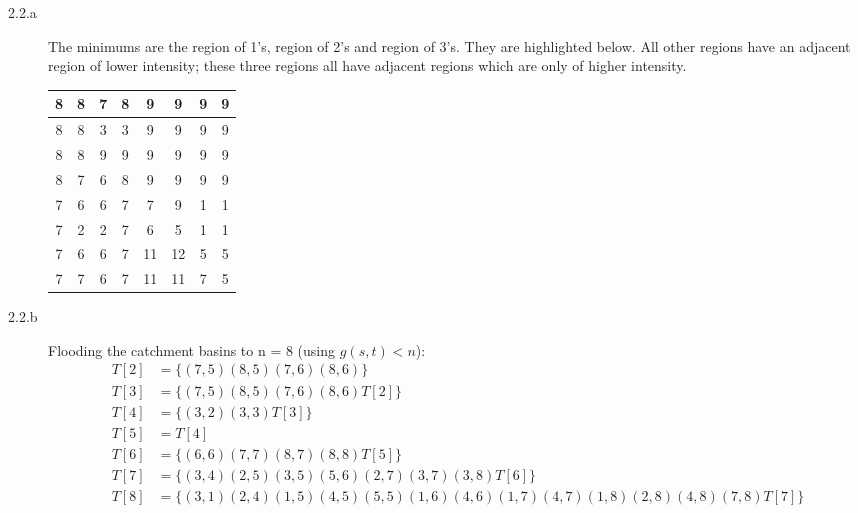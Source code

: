 \documentclass[fleqn]{article}
\begin{document}
\begin{description}
\item [2.2.a]
    The minimums are the region of 1's, region of 2's and region of 3's. They
        are highlighted below. All other regions have an adjacent region of
        lower intensity; these three regions all have adjacent regions which are
        only of higher intensity.

    \begin{tabular}{| c | c | c | c | c | c | c | c |}
        \hline
        8 & 8 & 7 & 8 & 9 & 9 & 9 & 9 \\ \hline
        8 & 8 & \cellcolor{green} 3 & \cellcolor{green} 3 & 9 & 9 & 9 & 9 \\ \hline
        8 & 8 & 9 & 9 & 9 & 9 & 9 & 9 \\ \hline
        8 & 7 & 6 & 8 & 9 & 9 & 9 & 9 \\ \hline
        7 & 6 & 6 & 7 & 7 & 9 & \cellcolor{green} 1 & \cellcolor{green} 1 \\ \hline
        7 & \cellcolor{green} 2 & \cellcolor{green} 2 & 7 & 6 & 5 & \cellcolor{green} 1 & \cellcolor{green} 1 \\ \hline
        7 & 6 & 6 & 7 & 11 & 12 & 5 & 5 \\ \hline
        7 & 7 & 6 & 7 & 11 & 11 & 7 & 5 \\
        \hline
    \end{tabular}

\item [2.2.b]
    Flooding the catchment basins to n = 8 (using \begin{math}g(s,t) <
    n\end{math}):
    \begin{align*}
        T[2] &= \{ (7,5) (8,5) (7,6) (8,6) \} \\
        T[3] &= \{ (7,5) (8,5) (7,6) (8,6) T[2] \} \\
        T[4] &= \{ (3,2) (3,3) T[3] \} \\
        T[5] &= T[4] \\
        T[6] &= \{ (6,6) (7,7) (8,7) (8,8) T[5] \} \\
        T[7] &= \{ (3,4) (2,5) (3,5) (5,6) (2,7) (3,7) (3,8) T[6] \} \\
        T[8] &= \{ (3,1) (2,4) (1,5) (4,5) (5,5) (1,6) (4,6) (1,7) (4,7) (1,8) (2,8) (4,8) (7,8) T[7] \}
    \end{align*}


\end{description}
\end{document}
